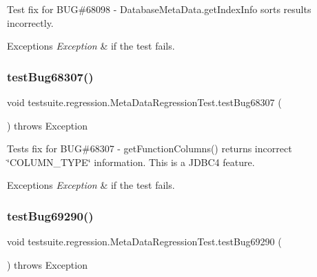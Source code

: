 Test fix for B\+UG\#68098 -\/ Database\+Meta\+Data.\+get\+Index\+Info sorts results incorrectly.


\begin{DoxyExceptions}{Exceptions}
{\em Exception} & if the test fails. \\
\hline
\end{DoxyExceptions}
\mbox{\label{classtestsuite_1_1regression_1_1_meta_data_regression_test_a7546dce3979e1d5f2f28703337b00e62}} 
\subsubsection{\texorpdfstring{test\+Bug68307()}{testBug68307()}}
{\footnotesize\ttfamily void testsuite.\+regression.\+Meta\+Data\+Regression\+Test.\+test\+Bug68307 (\begin{DoxyParamCaption}{ }\end{DoxyParamCaption}) throws Exception}

Tests fix for B\+UG\#68307 -\/ get\+Function\+Columns() returns incorrect \char`\"{}\+C\+O\+L\+U\+M\+N\+\_\+\+T\+Y\+P\+E\char`\"{} information. This is a J\+D\+B\+C4 feature.


\begin{DoxyExceptions}{Exceptions}
{\em Exception} & if the test fails. \\
\hline
\end{DoxyExceptions}
\mbox{\label{classtestsuite_1_1regression_1_1_meta_data_regression_test_a415c490c795a8501bb347c435a223360}} 
\subsubsection{\texorpdfstring{test\+Bug69290()}{testBug69290()}}
{\footnotesize\ttfamily void testsuite.\+regression.\+Meta\+Data\+Regression\+Test.\+test\+Bug69290 (\begin{DoxyParamCaption}{ }\end{DoxyParamCaption}) throws Exception}

